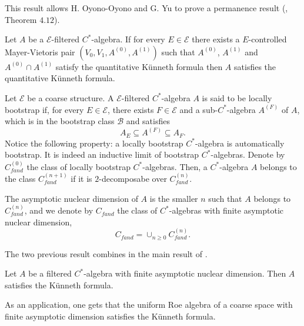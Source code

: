 \begin{frame}
This result allows H. Oyono-Oyono and G. Yu to prove a permanence result (\cite{OY4}, Theorem $4.12$).

\begin{thmfr}
Let $A$ be a $\mathcal E$-filtered $C^*$-algebra. If for every $E\in \mathcal E$ there exists a $E$-controlled Mayer-Vietoris pair $(V_0, V_1, A^{(0)}, A^{(1)})$ such that $A^{(0)}$, $A^{(1)}$ and $A^{(0)} \cap A^{(1)}$ satisfy the quantitative Künneth formula then $A$ satisfies the quantitative Künneth formula.   
\end{thmfr}
\end{frame}

\begin{frame}
Let $\mathcal E$ be a coarse structure. A $\mathcal E$-filtered $C^*$-algebra $A$ is said to be locally bootstrap if, for every $E\in \mathcal E$, there exists $F\in \mathcal E$ and a sub-$C^*$-algebra $A^{(F)}$ of $A$, which is in the bootstrap class $\mathcal B$ and satisfies
\[A_E \subseteq A^{(F)}\subseteq A_F. \]
Notice the following property: a locally bootstrap $C^*$-algebra is automatically bootstrap. It is indeed an inductive limit of bootstrap $C^*$-algebras. Denote by $C_{fand}^{(0)}$ the class of locally bootstrap $C^*$-algebras. Then, a $C^*$-algebra $A$ belongs to the class $C^{(n+1)}_{fand}$ if it is $2$-decomposabe over $C_{fand}^{(n)}$. \\
\end{frame}

\begin{frame}
The asymptotic nuclear dimension of $A$ is the smaller $n$ such that $A$ belongs to $C^{(n)}_{fand}$, and we denote by $C_{fand}$ the class of $C^*$-algebras with finite asymptotic nuclear dimension,
\[ C_{fand}  = \cup_{n\geq 0} C_{fand}^{(n)}.\]

The two previous result combines in the main result of \cite{OY4}.
\begin{thmfr}
Let $A$ be a filtered $C^*$-algebra with finite asymptotic nuclear dimension. Then $A$ satisfies the Künneth formula. \end{thmfr}

As an application, one gets that the uniform Roe algebra of a coarse space with finite asymptotic dimension satisfies the Künneth formula.\\
\end{frame}
